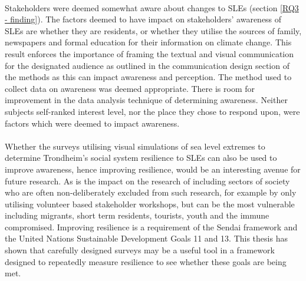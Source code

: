 \paragraph{}
Stakeholders were deemed somewhat aware about changes to SLEs (section \ref{RQ3 - finding}). The factors deemed to have impact on stakeholders' awareness of SLEs are whether they are residents, or whether they utilise the sources of family, newspapers and formal education for their information on climate change. This result enforces the importance of framing the textual and visual communication for the designated audience as outlined in the communication design section of the methods as this can impact awareness and perception.  The method used to collect data on awareness was deemed appropriate. There is room for improvement in the data analysis technique of determining awareness. Neither subjects self-ranked interest level, nor the place they chose to respond upon, were factors which were deemed to impact awareness.
\paragraph{}



Whether the surveys utilising visual simulations of sea level extremes to determine Trondheim's social system resilience to SLEs can also be used to improve awareness, hence improving resilience, would be an interesting avenue for future research. As is the impact on the research of including sectors of society who are often non-deliberately excluded from such research, for example by only utilising volunteer based stakeholder workshops, but can be the most vulnerable including migrants, short term residents, tourists, youth and the immune compromised. Improving resilience is a requirement of the Sendai framework and the United Nations Sustainable Development Goals 11 and 13. This thesis has shown that carefully designed surveys may be a useful tool in a framework designed to repeatedly measure resilience to see whether these goals are being met.



